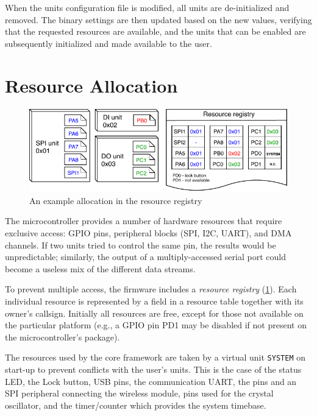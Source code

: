 When the units configuration file is modified, all units are de-initialized and removed. The binary settings are then updated based on the new values, verifying that the requested resources are available, and the units that can be enabled are subsequently initialized and made available to the user.

\section{Resource Allocation} \label{sec:res_allocation}

\begin{figure}[h]
	\centering
	\includegraphics[scale=1] {img/resource-repository.pdf}
	\caption{\label{fig:resource_repository}An example allocation in the resource registry}
\end{figure}

The microcontroller provides a number of hardware resources that require exclusive access: GPIO pins, peripheral blocks (\gls{SPI}, \gls{I2C}, \gls{UART}\textellipsis), and \gls{DMA} channels. If two units tried to control the same pin, the results would be unpredictable; similarly, the output of a multiply-accessed serial port could become a useless mix of the different data streams.

To prevent multiple access, the firmware includes a \textit{resource registry} (\cref{fig:resource_repository}). Each individual resource is represented by a field in a resource table together with its owner's callsign. Initially all resources are free, except for those not available on the particular platform (e.g., a \gls{GPIO} pin PD1 may be disabled if not present on the microcontroller's package).

The resources used by the core framework are taken by a virtual unit \verb|SYSTEM| on start-up to prevent conflicts with the user's units. This is the case of the status \gls{LED}, the Lock button, \gls{USB} pins, the communication \gls{UART}, the pins and an \gls{SPI} peripheral connecting the wireless module, pins used for the crystal oscillator, and the timer/counter which provides the system timebase.


